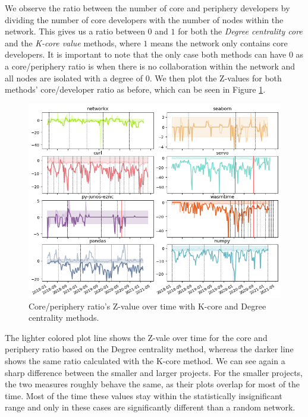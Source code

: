 We observe the ratio between the number of core and periphery developers by dividing the number of core developers with the number of nodes within the network. This gives us a ratio between $0$ and $1$ for both the \textit{Degree centrality core} and the \textit{K-core value} methods, where $1$ means the network only contains core developers. It is important to note that the only case both methods can have $0$ as a core/periphery ratio is when there is no collaboration within the network and all nodes are isolated with a degree of $0$. We then plot the Z-values for both methods' core/developer ratio as before, which can be seen in Figure \ref{fig:core-periphery}.

\begin{figure}
    \centering
    \includegraphics[width=\textwidth]{figures/qualitative/core_periphery/core_periphery_all.png}
    \caption{Core/periphery ratio's Z-value over time with K-core and Degree centrality methods.}
    \label{fig:core-periphery}

\end{figure}

The lighter colored plot line shows the Z-vale over time for the core and periphery ratio based on the Degree centrality method, whereas the darker line shows the same ratio calculated with the K-core method. We can see again a sharp difference between the smaller and larger projects. For the smaller projects, the two measures roughly behave the same, as their plots overlap for most of the time. Most of the time these values stay within the statistically insignificant range and only in these cases are significantly different than a random network.

